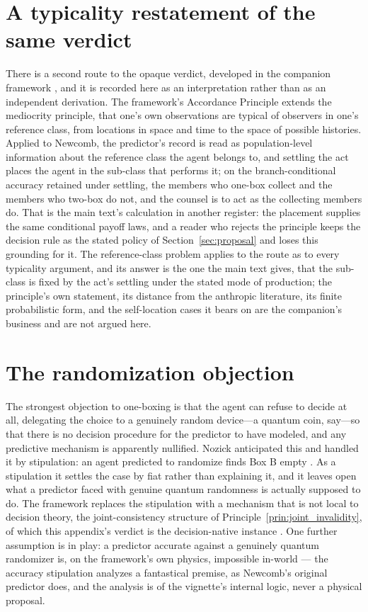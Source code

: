 \section{A typicality restatement of the same verdict}
\label{sec:anthropic}
\noindent There is a second route to the opaque verdict, developed in the companion framework \cite{Nexus, NexicFoundation}, and it is recorded here as an interpretation rather than as an independent derivation. The framework's Accordance Principle extends the mediocrity principle, that one's own observations are typical of observers in one's reference class, from locations in space and time to the space of possible histories. Applied to Newcomb, the predictor's record is read as population-level information about the reference class the agent belongs to, and settling the act places the agent in the sub-class that performs it; on the branch-conditional accuracy retained under settling, the members who one-box collect and the members who two-box do not, and the counsel is to act as the collecting members do. That is the main text's calculation in another register: the placement supplies the same conditional payoff laws, and a reader who rejects the principle keeps the decision rule as the stated policy of Section~\ref{sec:proposal} and loses this grounding for it. The reference-class problem applies to the route as to every typicality argument, and its answer is the one the main text gives, that the sub-class is fixed by the act's settling under the stated mode of production; the principle's own statement, its distance from the anthropic literature, its finite probabilistic form, and the self-location cases it bears on are the companion's business and are not argued here.

\section{The randomization objection}
\label{sec:randomization}

The strongest objection to one-boxing is that the agent can refuse to decide at all, delegating the choice to a genuinely random device---a quantum coin, say---so that there is no decision procedure for the predictor to have modeled, and any predictive mechanism is apparently nullified. Nozick anticipated this and handled it by stipulation: an agent predicted to randomize finds Box B empty \cite{nozick1969newcomb}. As a stipulation it settles the case by fiat rather than explaining it, and it leaves open what a predictor faced with genuine quantum randomness is actually supposed to do. The framework replaces the stipulation with a mechanism that is not local to decision theory, the joint-consistency structure of Principle~\ref{prin:joint_invalidity}, of which this appendix's verdict is the decision-native instance \cite{AethusBrief}. One further assumption is in play: a predictor accurate against a genuinely quantum randomizer is, on the framework's own physics, impossible in-world --- the accuracy stipulation analyzes a fantastical premise, as Newcomb's original predictor does, and the analysis is of the vignette's internal logic, never a physical proposal.

